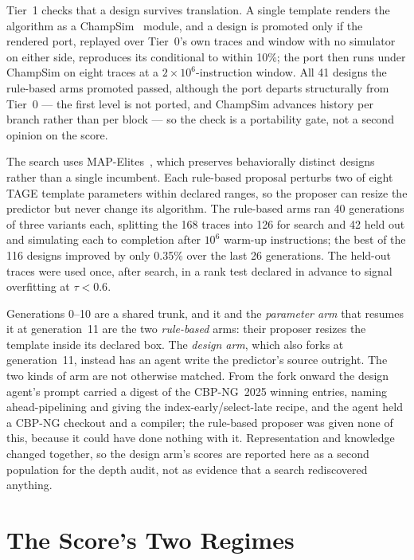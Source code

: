 \documentclass[conference]{IEEEtran}
\newcommand{\mpki}{\text{MPKI}}
\begin{document}
Tier~1 checks that a design survives translation. A single template renders the
algorithm as a ChampSim~\cite{champsim} module, and a design is promoted only if
the rendered port, replayed over Tier~0's own traces and window with no
simulator on either side, reproduces its conditional \mpki{} to within 10\%; the
port then runs under ChampSim on eight traces at a $2\times10^6$-instruction
window. All 41 designs the rule-based arms promoted passed, although the port
departs structurally
from Tier~0 --- the first level is not ported, and ChampSim advances history per
branch rather than per block --- so the check is a portability gate, not a
second opinion on the score.

The search uses MAP-Elites~\cite{mouret2015illuminating}, which preserves
behaviorally distinct designs rather than a single incumbent. Each rule-based
proposal perturbs two of eight TAGE template parameters within declared ranges,
so the proposer can resize the predictor but never change its algorithm. The
rule-based arms ran 40
generations of three variants each, splitting the 168 traces into 126 for search
and 42 held out and simulating each to completion after $10^6$ warm-up
instructions; the best of the 116 designs improved by only 0.35\% over the last
26 generations. The held-out traces were used once, after search, in a rank
test declared in advance to signal overfitting at $\tau<0.6$.

Generations 0--10 are a shared trunk, and it and the \emph{parameter arm} that
resumes it at generation~11 are the two \emph{rule-based} arms: their proposer
resizes the template inside its declared box. The \emph{design arm}, which also
forks at generation~11, instead has an agent write the predictor's source
outright. The two kinds of arm are not otherwise matched. From the fork onward
the design agent's prompt carried a digest of the CBP-NG~2025 winning entries,
naming ahead-pipelining and giving the index-early/select-late recipe, and the
agent held a CBP-NG checkout and a compiler; the rule-based proposer was given
none of this, because it could have done nothing with it. Representation and
knowledge changed together, so the design arm's scores are reported here as
a second population for the depth audit, not as evidence that a search
rediscovered anything.

\section{The Score's Two Regimes}
\end{document}
